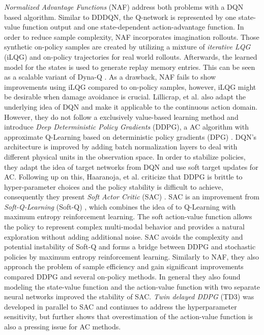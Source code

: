 	\textit{Normalized Advantage Functions} (NAF) \cite{Gu2016} address both problems with a DQN based algorithm.
	Similar to DDDQN, the Q-network is represented by one state-value function output and one state-dependent action-advantage function.
	In order to reduce sample complexity, NAF incorporates imagination rollouts. 
	Those synthetic on-policy samples are created by utilizing a mixture of \textit{iterative LQG} (iLQG) \cite{Todorov2005} and on-policy trajectories for real world rollouts.
	Afterwards, the learned model for the states is used to generate replay memory entries. 
	This can be seen as a scalable variant of Dyna-Q \cite{Sutton1990}. 
	As a drawback, NAF fails to show improvements using iLQG compared to on-policy samples, however, iLQG might be desirable when damage avoidance is crucial. 
	Lillicrap, et al. \cite{Lillicrap2016} also adapt the underlying idea of DQN \cite{Mnih2015} and make it applicable to the continuous action domain. 
	However, they do not follow a exclusively value-based learning method and introduce \textit{Deep Deterministic Policy Gradients} (DDPG), a AC algorithm with approximate Q-Learning based on deterministic policy gradients (DPG) \cite{Silver2014}.
	DQN's architecture is improved by adding batch normalization layers \cite{Ioffe2015} to deal with different physical units in the observation space. 
	In order to stabilize policies, they adapt the idea of target networks from DQN and use soft target updates for AC. 
	Following up on this, Haaranoja, et al. criticize that DDPG is brittle to hyper-parameter choices and the policy stability is difficult to achieve, consequently they present \textit{Soft Actor Critic} (SAC) \cite{Haarnoja2018}.
	SAC is an improvement from \textit{Soft-Q-Learning} (Soft-Q) \cite{Haarnoja2017}, which combines the idea of to Q-Learning with maximum entropy reinforcement learning.
	The soft action-value function allows the policy to represent complex multi-modal behavior and provides a natural exploration  without adding additional noise.
	SAC avoids the complexity and potential instability of Soft-Q and forms a bridge between DDPG and stochastic policies by maximum entropy reinforcement learning.
	Similarly to NAF, they also approach the problem of sample efficiency and gain significant improvements compared DDPG and several on-policy methods.
	In general they also found modeling the state-value function and the action-value function with two separate neural networks improved the stability of SAC. 
	\textit{Twin delayed DDPG} (TD3) \cite{Fujimoto2018} was developed in parallel to SAC and continues to address the hyperparameter sensitivity, but further shows that overestimation of the action-value function is also a pressing issue for AC methods. 
